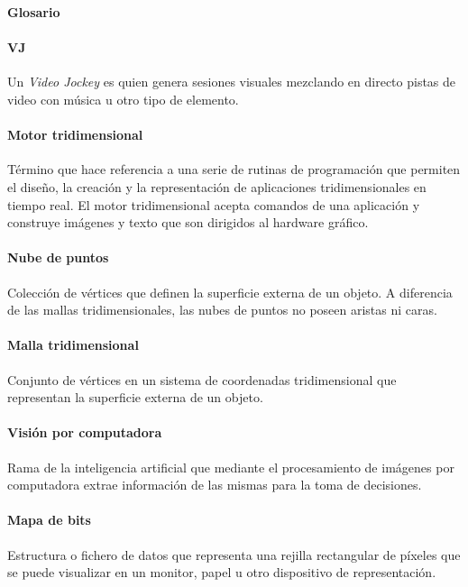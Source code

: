 ﻿\Huge
\textbf{Glosario}

\vspace{10 mm}

\normalsize 

\paragraph{VJ}
Un \emph{Video Jockey} es quien genera sesiones visuales mezclando en directo pistas de video con música u otro tipo de elemento.

\paragraph{Motor tridimensional}
Término que hace referencia a una serie de rutinas de programación que permiten el diseño, la creación y la representación de aplicaciones tridimensionales en tiempo real.
El motor tridimensional acepta comandos de una aplicación y construye imágenes y texto que son dirigidos al hardware gráfico.
 
\paragraph{Nube de puntos}
Colección de vértices que definen la superficie externa de un objeto.
A diferencia de las mallas tridimensionales, las nubes de puntos no poseen aristas ni caras.

\paragraph{Malla tridimensional}
Conjunto de vértices en un sistema de coordenadas tridimensional que representan la superficie externa de un objeto.

\paragraph{Visión por computadora}
Rama de la inteligencia artificial que mediante el procesamiento de imágenes por computadora extrae información de las mismas para la toma de decisiones.

\paragraph{Mapa de bits}
Estructura o fichero de datos que representa una rejilla rectangular de píxeles que se puede visualizar en un monitor, papel u otro dispositivo de representación.

